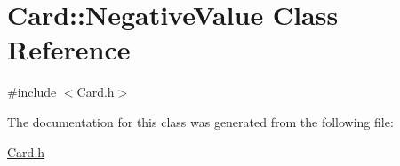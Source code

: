 \hypertarget{class_card_1_1_negative_value}{}\section{Card\+:\+:Negative\+Value Class Reference}
\label{class_card_1_1_negative_value}


{\ttfamily \#include $<$Card.\+h$>$}



The documentation for this class was generated from the following file\+:\begin{DoxyCompactItemize}
\item 
\mbox{\hyperlink{_card_8h}{Card.\+h}}\end{DoxyCompactItemize}
